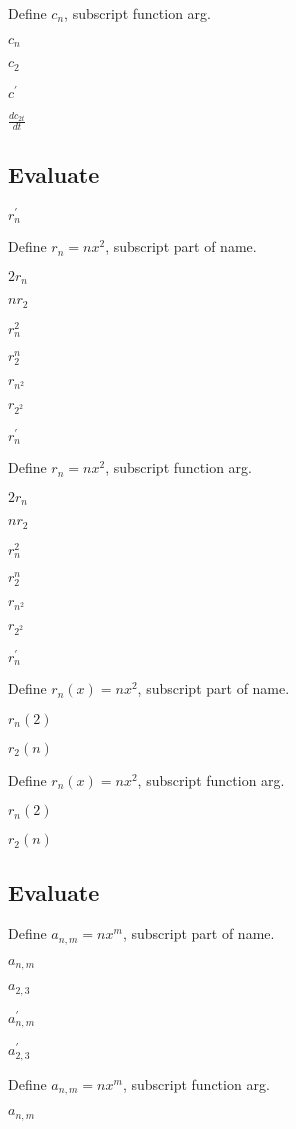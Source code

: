 \documentclass{article}
\begin{document}
Define $c_{n}$, subscript function arg.

$c_{n}$

$c_{2}$

$c^{\prime }$

$\frac{dc_{2t}}{dt}$

\subsection{Evaluate}

$r_{n}^{\prime }$

Define $r_{n}=nx^{2}$, subscript part of name.

$2r_{n}$

$nr_{2}$

$r_{n}^{2}$

$r_{2}^{n}$

$r_{n^{2}}$

$r_{2^{2}}$

$r_{n}^{\prime }$

Define $r_{n}=nx^{2}$, subscript function arg.

$2r_{n}$

$nr_{2}$

$r_{n}^{2}$

$r_{2}^{n}$

$r_{n^{2}}$

$r_{2^{2}}$

$r_{n}^{\prime }$

Define $r_{n}\left( x\right) =nx^{2}$, subscript part of name.

$r_{n}\left( 2\right) $

$r_{2}\left( n\right) $

Define $r_{n}\left( x\right) =nx^{2}$, subscript function arg.

$r_{n}\left( 2\right) $

$r_{2}\left( n\right) $

\subsection{Evaluate}

Define $a_{n,m}=nx^{m}$, subscript part of name.

$a_{n,m}$

$a_{2,3}$

$a_{n,m}^{\prime }$

$a_{2,3}^{\prime }$

Define $a_{n,m}=nx^{m}$, subscript function arg.

$a_{n,m}$
\end{document}
